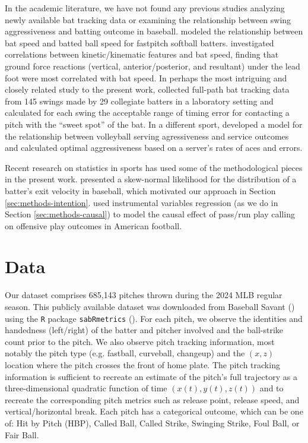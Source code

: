 \documentclass{article}
\begin{document}
      In the academic literature, we have not found any previous studies analyzing newly available bat tracking data or examining the relationship between swing aggressiveness and batting outcome in baseball. \textcite{nevins_sensitivity_2019} modeled the relationship between bat speed and batted ball speed for fastpitch softball batters. \textcite{orishimo_lower_2024} investigated correlations between kinetic/kinematic features and bat speed, finding that ground force reactions (vertical, anterior/posterior, and resultant) under the lead foot were most correlated with bat speed. In perhaps the most intriguing and closely related study to the present work, \textcite{nakashima_acceptable_2025} collected full-path bat tracking data from 145 swings made by 29 collegiate batters in a laboratory setting and calculated for each swing the acceptable range of timing error for contacting a pitch with the ``sweet spot'' of the bat. In a different sport, \textcite{burton_linear_2015} developed a model for the relationship between volleyball serving agressiveness and service outcomes and calculated optimal aggressiveness based on a server's rates of aces and errors.

      Recent research on statistics in sports has used some of the methodological pieces in the present work. \textcite{judge_exit_2024} presented a skew-normal likelihood for the distribution of a batter's exit velocity in baseball, which motivated our approach in Section \ref{sec:methods-intention}. \textcite{putman_tackling_2025} used instrumental variables regression (as we do in Section \ref{sec:methods-causal}) to model the causal effect of pass/run play calling on offensive play outcomes in American football.

  \section{Data}
  \label{sec:data}

    Our dataset comprises 685,143 pitches thrown during the 2024 MLB regular season. This publicly available dataset was downloaded from Baseball Savant (\cite{mlb_advanced_media_statcast_2024}) using the \texttt{R} package \texttt{sabRmetrics} (\cite{powers_sabrmetrics_2025}). For each pitch, we observe the identities and handedness (left/right) of the batter and pitcher involved and the ball-strike count prior to the pitch. We also observe pitch tracking information, most notably the pitch type (e.g. fastball, curveball, changeup) and the $(x, z)$ location where the pitch crosses the front of home plate. The pitch tracking information is sufficient to recreate an estimate of the pitch's full trajectory as a three-dimensional quadratic function of time $(x(t), y(t), z(t))$ and to recreate the corresponding pitch metrics such as release point, release speed, and vertical/horizontal break. Each pitch has a categorical outcome, which can be one of: Hit by Pitch (HBP), Called Ball, Called Strike, Swinging Strike, Foul Ball, or Fair Ball.
\end{document}
